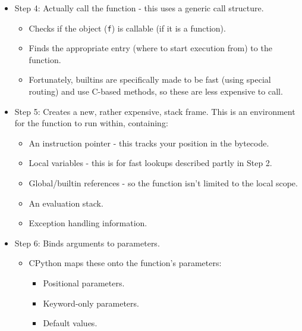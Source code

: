 \documentclass[../main.tex]{subfiles}
\begin{document}
\begin{itemize}
\begin{itemize}
            \item \verb|f(x)| - creates a simple array of arguments.
            \item \verb|f(x, y=3)| - builds a map of the keyword names (kwargs) to values (args).
            \item \verb|f(*arg, **kwargs)| - unpacks mappings.
        \end{itemize}\\
        \item Step 4: Actually call the function - this uses a generic call structure.
        \begin{itemize}
            \item Checks if the object (\verb|f|) is callable (if it is a function).
            \item Finds the appropriate entry (where to start execution from) to the function.
            \item Fortunately, builtins are specifically made to be fast (using special routing) and use C-based methods, so these are less expensive to call.
        \end{itemize}
        \item Step 5: Creates a new, rather expensive, stack frame. This is an environment for the function to run within, containing:
        \begin{itemize}
            \item An instruction pointer - this tracks your position in the bytecode.
            \item Local variables - this is for fast lookups described partly in Step 2.
            \item Global/builtin references - so the function isn't limited to the local scope.
            \item An evaluation stack.
            \item Exception handling information.
        \end{itemize}
        \item Step 6: Binds arguments to parameters.
        \begin{itemize}
            \item CPython maps these onto the function's parameters:
            \begin{itemize}
                \item Positional parameters.
                \item Keyword-only parameters.
                \item Default values.

\end{itemize}
\end{itemize}
\end{itemize}
\end{document}
